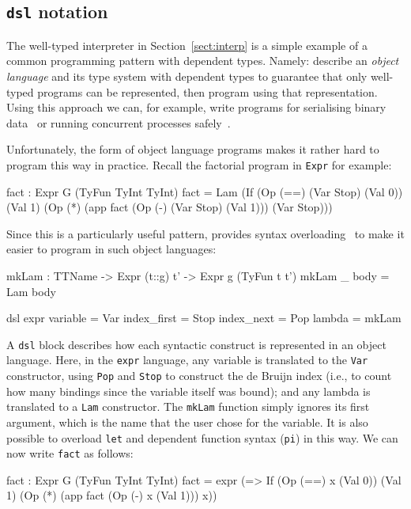 \subsection{\texttt{dsl} notation}

The well-typed interpreter in Section~\ref{sect:interp} is a simple example of a common programming pattern with dependent types.
Namely: describe an \emph{object language} and its type system with dependent types to guarantee that only well-typed programs can be represented, then program using that representation.
Using this approach we can, for example, write programs for serialising binary data~\cite{plpv11} or running concurrent processes safely~\cite{cbconc-fi}.

Unfortunately, the form of object language programs makes it rather hard to program this way in practice.
Recall the factorial program in \texttt{Expr} for example:

\begin{code}
fact : Expr G (TyFun TyInt TyInt)
fact = Lam (If (Op (==) (Var Stop) (Val 0))
               (Val 1) (Op (*) (app fact (Op (-) (Var Stop) (Val 1))) 
                               (Var Stop)))
\end{code}

\noindent
Since this is a particularly useful pattern, \Idris{} provides syntax overloading~\cite{res-dsl-padl12} to make it easier to program in such object languages:

\begin{code}
mkLam : TTName -> Expr (t::g) t' -> Expr g (TyFun t t')
mkLam _ body = Lam body

dsl expr
    variable    = Var
    index_first = Stop
    index_next  = Pop
    lambda      = mkLam
\end{code} 

\noindent
A \texttt{dsl} block describes how each syntactic construct is represented in an object language.
Here, in the \texttt{expr} language, any variable is translated to the \texttt{Var} constructor, using \texttt{Pop} and \texttt{Stop} to construct the de Bruijn index (i.e., to count how many bindings since the variable itself was bound); and any \Idris{} lambda is translated to a \texttt{Lam} constructor.
The \texttt{mkLam} function simply ignores its first argument, which is the name that the user chose for the variable.
It is also possible to overload \texttt{let} and dependent function syntax (\texttt{pi}) in this way.
We can now write \texttt{fact} as follows:

\begin{code}
fact : Expr G (TyFun TyInt TyInt)
fact = expr (\x => If (Op (==) x (Val 0))
                      (Val 1) (Op (*) (app fact (Op (-) x (Val 1))) x))
\end{code} 

